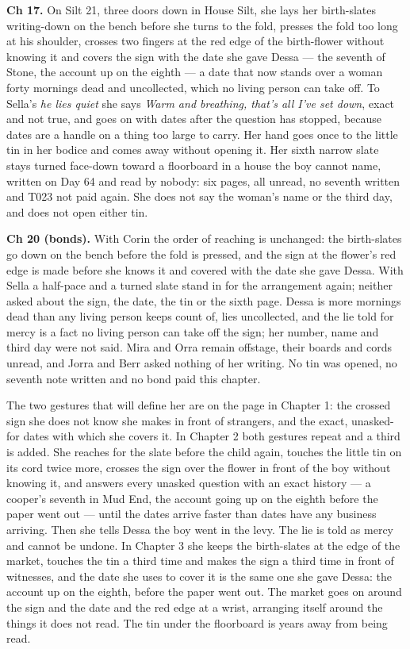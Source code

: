 \documentclass{design/chronicle}
\begin{document}
{\textbf{Ch 17.} On Silt 21, three doors down in House Silt, she lays her birth-slates writing-down on the bench before she turns to the fold, presses the fold too long at his shoulder, crosses two fingers at the red edge of the birth-flower without knowing it and covers the sign with the date she gave Dessa — the seventh of Stone, the account up on the eighth — a date that now stands over a woman forty mornings dead and uncollected, which no living person can take off. To Sella’s \emph{he lies quiet} she says \emph{Warm and breathing, that’s all I’ve set down}, exact and not true, and goes on with dates after the question has stopped, because dates are a handle on a thing too large to carry. Her hand goes once to the little tin in her bodice and comes away without opening it. Her sixth narrow slate stays turned face-down toward a floorboard in a house the boy cannot name, written on Day 64 and read by nobody: six pages, all unread, no seventh written and T023 not paid again. She does not say the woman’s name or the third day, and does not open either tin.

\textbf{Ch 20 (bonds).} With Corin the order of reaching is unchanged: the birth-slates go down on the bench before the fold is pressed, and the sign at the flower’s red edge is made before she knows it and covered with the date she gave Dessa. With Sella a half-pace and a turned slate stand in for the arrangement again; neither asked about the sign, the date, the tin or the sixth page. Dessa is more mornings dead than any living person keeps count of, lies uncollected, and the lie told for mercy is a fact no living person can take off the sign; her number, name and third day were not said. Mira and Orra remain offstage, their boards and cords unread, and Jorra and Berr asked nothing of her writing. No tin was opened, no seventh note written and no bond paid this chapter.

The two gestures that will define her are on the page in Chapter 1: the crossed sign she does not know she makes in front of strangers, and the exact, unasked-for dates with which she covers it. In Chapter 2 both gestures repeat and a third is added. She reaches for the slate before the child again, touches the little tin on its cord twice more, crosses the sign over the flower in front of the boy without knowing it, and answers every unasked question with an exact history --- a cooper’s seventh in Mud End, the account going up on the eighth before the paper went out --- until the dates arrive faster than dates have any business arriving. Then she tells Dessa the boy went in the levy. The lie is told as mercy and cannot be undone. In Chapter 3 she keeps the birth-slates at the edge of the market, touches the tin a third time and makes the sign a third time in front of witnesses, and the date she uses to cover it is the same one she gave Dessa: the account up on the eighth, before the paper went out. The market goes on around the sign and the date and the red edge at a wrist, arranging itself around the things it does not read. The tin under the floorboard is years away from being read.

}
\end{document}
